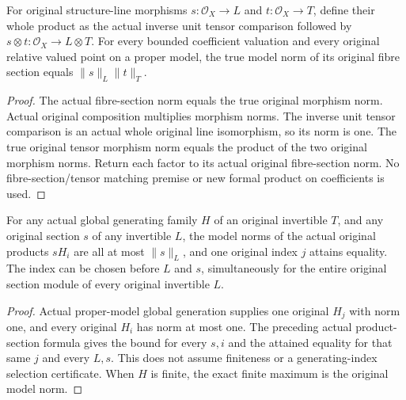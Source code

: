 \begin{lemma}
\label{lem:seven-general-original-product-section}
\leanok
{}
For original structure-line morphisms $s:\mathcal O_X\to L$ and
$t:\mathcal O_X\to T$, define their whole product as the actual inverse
unit tensor comparison followed by $s\otimes t:\mathcal O_X\to L\otimes T$.
For every bounded coefficient valuation and every original relative
valued point on a proper model, the true model norm of its original
fibre section equals $\lVert s\rVert_L\lVert t\rVert_T$.
\end{lemma}
\begin{proof}
The actual fibre-section norm equals the true original morphism norm.
Actual original composition multiplies morphism norms. The inverse unit
tensor comparison is an actual whole original line isomorphism, so its
norm is one. The true original tensor morphism norm equals the product
of the two original morphism norms. Return each factor to its actual
original fibre-section norm. No fibre-section/tensor matching premise
or new formal product on coefficients is used.
\end{proof}

\begin{theorem}
\label{thm:seven-general-original-generated-product-maximum}
\leanok
{}
For any actual global generating family $H$ of an original invertible
$T$, and any original section $s$ of any invertible $L$, the model norms
of the actual original products $sH_i$ are all at most $\lVert s\rVert_L$,
and one original index $j$ attains equality. The index can be chosen
before $L$ and $s$, simultaneously for the entire original section
module of every original invertible $L$.
\end{theorem}
\begin{proof}
Actual proper-model global generation supplies one original $H_j$ with
norm one, and every original $H_i$ has norm at most one. The preceding
actual product-section formula gives the bound for every $s,i$ and the
attained equality for that same $j$ and every $L,s$. This does not assume
finiteness or a generating-index selection certificate. When $H$ is
finite, the exact finite maximum is the original model norm.
\end{proof}


